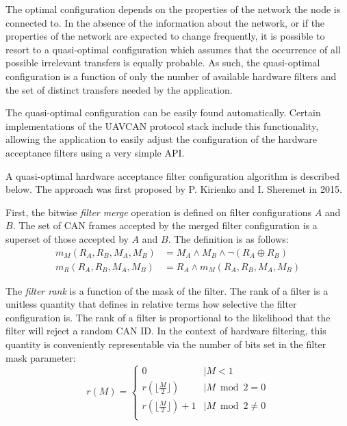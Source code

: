 \begin{remark}[breakable]
    The optimal configuration depends on the properties of the network the node is connected to.
    In the absence of the information about the network,
    or if the properties of the network are expected to change frequently,
    it is possible to resort to a quasi-optimal configuration which assumes that
    the occurrence of all possible irrelevant transfers is equally probable.
    As such, the quasi-optimal configuration is a function of only the number of available hardware filters
    and the set of distinct transfers needed by the application.

    The quasi-optimal configuration can be easily found automatically.
    Certain implementations of the UAVCAN protocol stack include this functionality,
    allowing the application to easily adjust the configuration of the hardware acceptance filters
    using a very simple API.

    A quasi-optimal hardware acceptance filter configuration algorithm is described below.
    The approach was first proposed by P. Kirienko and I. Sheremet in 2015.

    First, the bitwise \emph{filter merge} operation is defined on filter configurations $A$ and $B$.
    The set of CAN frames accepted by the merged filter configuration is a superset of
    those accepted by $A$ and $B$.
    The definition is as follows:
    \begin{equation*}
    \begin{split}
        m_M(R_A, R_B, M_A, M_B) & = M_A \land M_B \land \neg (R_A \oplus R_B) \\
        m_R(R_A, R_B, M_A, M_B) & = R_A \land m_M(R_A, R_B, M_A, M_B)
    \end{split}
    \end{equation*}

    The \emph{filter rank} is a function of the mask of the filter.
    The rank of a filter is a unitless quantity that defines in relative terms how selective the filter
    configuration is.
    The rank of a filter is proportional to the likelihood that the filter will reject a random CAN ID.
    In the context of hardware filtering, this quantity is conveniently representable via the number of bits set in
    the filter mask parameter:
    \begin{equation*}
    r(M) =
    \begin{cases}
        0                                   &\mid M < 1 \\
        r(\lfloor\frac{M}{2}\rfloor)        &\mid M \bmod 2 = 0 \\
        r(\lfloor\frac{M}{2}\rfloor) + 1    &\mid M \bmod 2 \neq 0 \\
    \end{cases}
    \end{equation*}


\end{remark}
